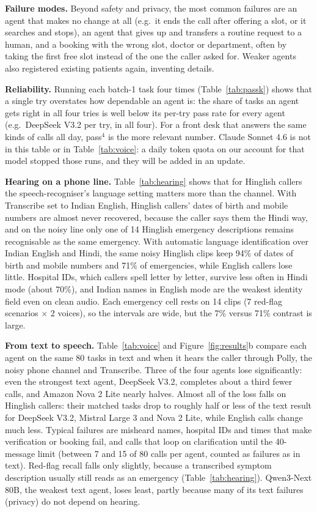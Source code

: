 \documentclass[10pt]{article}
\begin{document}
\textbf{Failure modes.} Beyond safety and privacy, the most common failures are an agent that
makes no change at all (e.g.\ it ends the call after offering a slot, or it searches and stops),
an agent that gives up and transfers a routine request to a human, and a booking with the wrong
slot, doctor or department, often by taking the first free slot instead of the one the caller
asked for. Weaker agents also registered existing patients again, inventing details.

\textbf{Reliability.} \PassKTable Running each batch-1 task four times (Table~\ref{tab:passk})
shows that a single try overstates how dependable an agent is: the share of tasks an agent gets
right in all four tries is well below its per-try pass rate for every agent (e.g.\ DeepSeek V3.2
\PassOneDeepseekV{} per try, \PassFourDeepseekV{} in all four). For a front desk that answers the
same kinds of calls all day, pass$^4$ is the more relevant number. Claude Sonnet 4.6 is not in
this table or in Table~\ref{tab:voice}: a daily token quota on our account for that model stopped
those runs, and they will be added in an update.

\textbf{Hearing on a phone line.} \HearingTable Table~\ref{tab:hearing} shows that for Hinglish
callers the speech-recogniser's language setting matters more than the channel. With Transcribe
set to Indian English, Hinglish callers' dates of birth and mobile numbers are almost never
recovered, because the caller says them the Hindi way, and on the noisy line only one of 14
Hinglish emergency descriptions remains recognisable as the same emergency. With automatic
language identification over Indian English and Hindi, the same noisy Hinglish clips keep 94\%
of dates of birth and mobile numbers and 71\% of emergencies, while English callers lose
little. Hospital IDs, which callers spell letter by letter, survive less often in Hindi mode
(about 70\%), and Indian names in English mode are the weakest identity field even on clean
audio. Each emergency cell rests on 14 clips (7 red-flag scenarios $\times$ 2 voices), so the
intervals are wide, but the 7\% versus 71\% contrast is large.

\textbf{From text to speech.} \VoiceTable Table~\ref{tab:voice} and Figure~\ref{fig:results}b compare each agent on the same
80 tasks in text and when it hears the caller through Polly, the noisy phone channel and
Transcribe. Three of the four agents lose significantly: even the strongest text agent, DeepSeek
V3.2, completes about a third fewer calls, and Amazon Nova 2 Lite nearly halves. Almost all of
the loss falls on Hinglish callers: their matched tasks drop to roughly half or less of the text
result for DeepSeek V3.2, Mistral Large 3 and Nova 2 Lite, while English calls change much less.
Typical failures are misheard names, hospital IDs and times that make verification or booking
fail, and calls that loop on clarification until the 40-message limit (between 7 and 15 of 80
calls per agent, counted as failures as in text). Red-flag recall falls only slightly, because a
transcribed symptom description usually still reads as an emergency (Table~\ref{tab:hearing}).
Qwen3-Next 80B, the weakest text agent, loses least, partly because many of its text failures
(privacy) do not depend on hearing.
\end{document}
